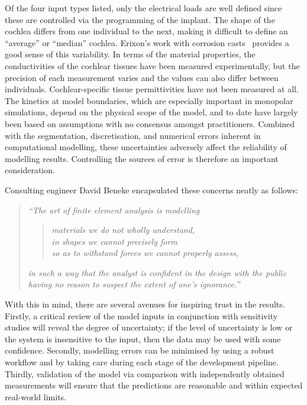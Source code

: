 Of the four input types listed, only the electrical loads are well defined since
these are controlled via the programming of the implant. The shape of the cochlea
differs from one individual to the next, making it difficult to define an
``average'' or ``median'' cochlea. Erixon's work with corrosion
casts~\cite{erixon2009} provides a good sense of this variability. In terms of
the material properties, the conductivities of the cochlear tissues have been
measured experimentally, but the precision of each measurement varies and the
values can also differ between individuals. Cochlear-specific tissue
permittivities have not been measured at all. The kinetics at model boundaries,
which are especially important in monopolar simulations, depend on the physical
scope of the model, and to date have largely been based on assumptions with no
consensus amongst practitioners. Combined with the segmentation, discretisation,
and numerical errors inherent in computational modelling, these uncertainties
adversely affect the reliability of modelling results. Controlling the sources
of error is therefore an important consideration.

Consulting engineer David Beneke encapsulated these concerns neatly as follows:

\begin{verse}
	\textit{
		``The art of finite element analysis is modelling}
		
	\begin{quote}
		\indent \textit{materials we do not wholly understand,} \\
		\indent \textit{in shapes we cannot precisely form} \\
		\indent \textit{so as to withstand forces we cannot properly assess,}
	\end{quote}
	
	\textit{		
		in such a way that the analyst is confident in the design with the public
		having no reason to suspect the extent of one's ignorance.''}

	\vspace{4mm}

\end{verse}

With this in mind, there are several avenues for inspiring trust in the
\insilico{} results. Firstly, a critical review of the model inputs in
conjunction with sensitivity studies will reveal the degree of uncertainty; if
the level of uncertainty is low or the system is insensitive to the input, then
the data may be used with some confidence. Secondly, modelling errors can be
minimised by using a robust workflow and by taking care during each stage of the
development pipeline. Thirdly, validation of the model via comparison with
independently obtained \invivo{} measurements will ensure that the \insilico{}
predictions are reasonable and within expected real-world limits.

